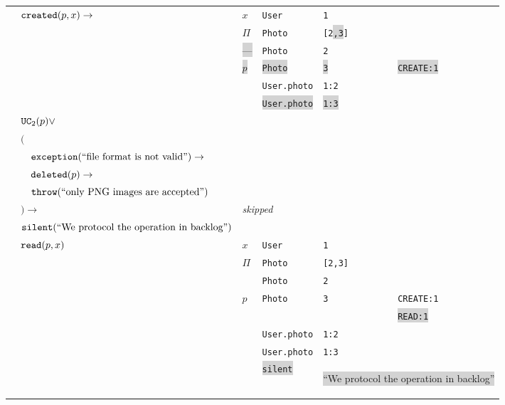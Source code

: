 \documentclass{article}
\begin{document}
\begin{tabular}[t]{l|llll}
        \hline
        $\quad \mbox{\texttt{created}}(p, x) \to$
            & $x$ & \texttt{User} & \texttt{1} \\
            & $\Pi$ & \texttt{Photo} & \texttt{[2\colorbox{lightgray}{,3}]} \\
            & \colorbox{lightgray}{---} & \texttt{Photo} & \texttt{2} \\
            & \colorbox{lightgray}{$p$} & \colorbox{lightgray}{\texttt{Photo}} & \colorbox{lightgray}{\texttt{3}} & \colorbox{lightgray}{\texttt{CREATE:1}} \\
            & & \texttt{User.photo} & \texttt{1:2} \\
            & & \colorbox{lightgray}{\texttt{User.photo}} & \colorbox{lightgray}{\texttt{1:3}} \\
            
        \hline
        $\quad \mbox{\texttt{UC}}_2(p) \vee$ \\
        $\quad ($ \\
        $\quad\quad \mbox{\texttt{exception}}(\mbox{``file format is not valid''}) \to$ \\
        $\quad\quad \mbox{\texttt{deleted}}(p) \to$ \\
        $\quad\quad \mbox{\texttt{throw}}(\mbox{``only PNG images are accepted''})$ \\
        $\quad ) \to$
            & \multicolumn{4}{l}{\textit{skipped}} \\
        
        \hline
        $\quad \mbox{\texttt{silent}}(\mbox{``We protocol the operation in backlog''})$ \\
        $\quad \mbox{\texttt{read}}(p, x) $
            & $x$ & \texttt{User} & \texttt{1} \\
            & $\Pi$ & \texttt{Photo} & \texttt{[2,3]} \\
            &  & \texttt{Photo} & \texttt{2} \\
            & $p$ & \texttt{Photo} & \texttt{3} & \texttt{CREATE:1} \\
            &     &                &            & \colorbox{lightgray}{\texttt{READ:1}} \\
            & & \texttt{User.photo} & \texttt{1:2} \\
            & & \texttt{User.photo} & \texttt{1:3} \\
            & & \colorbox{lightgray}{\texttt{silent}} & 
                \multicolumn{2}{l}{\colorbox{lightgray}{\parbox[t]{10em}{\raggedright``We protocol the operation in backlog''}}} \\
        
    \end{tabular}
    
\end{document}
